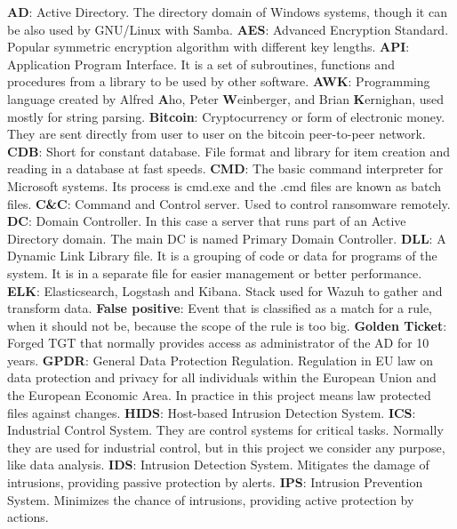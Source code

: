 \textbf{AD}: Active Directory. The directory domain of Windows systems, though it can be also used by GNU/Linux with Samba.
\linej
\linej
\textbf{AES}: Advanced Encryption Standard. Popular symmetric encryption algorithm with different key lengths.
\linej
\linej
\textbf{API}: Application Program Interface. It is a set of subroutines, functions and procedures from a library to be used by other software.
\linej
\linej
\textbf{AWK}: Programming language created by Alfred \textbf{A}ho, Peter \textbf{W}einberger, and Brian \textbf{K}ernighan, used mostly for string parsing.
\linej
\linej
\textbf{Bitcoin}: Cryptocurrency or form of electronic money. They are sent directly from user to user on the bitcoin peer-to-peer network.
\linej
\linej
\textbf{CDB}: Short for constant database. File format and library for item creation and reading in a database at fast speeds.
\linej
\linej
\textbf{CMD}: The basic command interpreter for Microsoft systems. Its process is cmd.exe and the .cmd files are known as batch files.
\linej
\linej
\textbf{C\&C}: Command and Control server. Used to control ransomware remotely.
\linej
\linej
\textbf{DC}: Domain Controller. In this case a server that runs part of an Active Directory domain. The main DC is named Primary Domain Controller.
\linej
\linej
\textbf{DLL}: A Dynamic Link Library file. It is a grouping of code or data for programs of the system. It is in a separate file for easier management or better performance.
\linej
\linej
\textbf{ELK}: Elasticsearch, Logstash and Kibana. Stack used for Wazuh to gather and transform data.
\linej
\linej
\textbf{False positive}: Event that is classified as a match for a rule, when it should not be, because the scope of the rule is too big.
\linej
\linej
\textbf{Golden Ticket}: Forged TGT that normally provides access as administrator of the AD for 10 years.
\linej
\linej
\textbf{GPDR}: General Data Protection Regulation. Regulation in EU law on data protection and privacy for all individuals within the European Union and the European Economic Area. In practice in this project means law protected files against changes.
\linej
\linej
\textbf{HIDS}: Host-based Intrusion Detection System.
\linej
\linej
\textbf{ICS}: Industrial Control System. They are control systems for critical tasks. Normally they are used for industrial control, but in this project we consider any purpose, like data analysis.
\linej
\linej
\textbf{IDS}: Intrusion Detection System. Mitigates the damage of intrusions, providing passive protection by alerts.
\linej
\linej
\textbf{IPS}: Intrusion Prevention System. Minimizes the chance of intrusions, providing active protection by actions.
